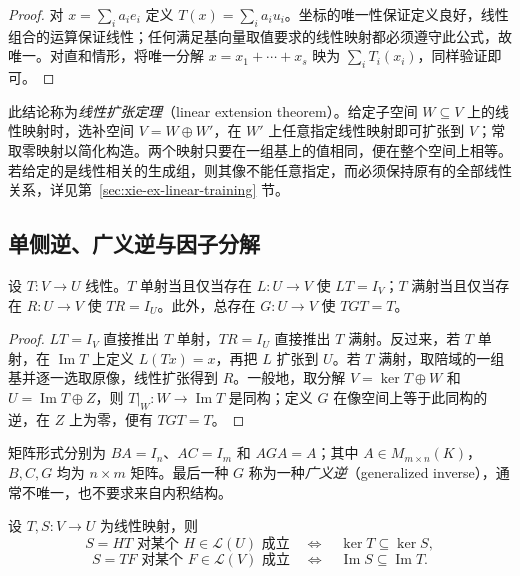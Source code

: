 \begin{proof}
对 $x=\sum_i a_ie_i$ 定义 $T(x)=\sum_i a_iu_i$。坐标的唯一性保证定义良好，线性组合的运算保证线性；任何满足基向量取值要求的线性映射都必须遵守此公式，故唯一。对直和情形，将唯一分解 $x=x_1+\cdots+x_s$ 映为 $\sum_iT_i(x_i)$，同样验证即可。
\end{proof}

此结论称为\emph{线性扩张定理}（linear extension theorem）。给定子空间 $W\subseteq V$ 上的线性映射时，选补空间 $V=W\oplus W'$，在 $W'$ 上任意指定线性映射即可扩张到 $V$；常取零映射以简化构造。两个映射只要在一组基上的值相同，便在整个空间上相等。若给定的是线性相关的生成组，则其像不能任意指定，而必须保持原有的全部线性关系，详见第~\ref{sec:xie-ex-linear-training} 节。

\subsection{单侧逆、广义逆与因子分解}

\begin{proposition}
\label{prop:xie-ex-splitting-inverses}
设 $T:V\to U$ 线性。$T$ 单射当且仅当存在 $L:U\to V$ 使 $LT=I_V$；$T$ 满射当且仅当存在 $R:U\to V$ 使 $TR=I_U$。此外，总存在 $G:U\to V$ 使 $TGT=T$。
\end{proposition}

\begin{proof}
$LT=I_V$ 直接推出 $T$ 单射，$TR=I_U$ 直接推出 $T$ 满射。反过来，若 $T$ 单射，在 $\operatorname{Im}T$ 上定义 $L(Tx)=x$，再把 $L$ 扩张到 $U$。若 $T$ 满射，取陪域的一组基并逐一选取原像，线性扩张得到 $R$。一般地，取分解 $V=\ker T\oplus W$ 和 $U=\operatorname{Im}T\oplus Z$，则 $T|_W:W\to\operatorname{Im}T$ 是同构；定义 $G$ 在像空间上等于此同构的逆，在 $Z$ 上为零，便有 $TGT=T$。
\end{proof}

矩阵形式分别为 $BA=I_n$、$AC=I_m$ 和 $AGA=A$；其中 $A\in M_{m\times n}(K)$，$B,C,G$ 均为 $n\times m$ 矩阵。最后一种 $G$ 称为一种\emph{广义逆}（generalized inverse），通常不唯一，也不要求来自内积结构。

\begin{proposition}
\label{prop:xie-ex-factorization}
设 $T,S:V\to U$ 为线性映射，则
\[
    S=HT\text{ 对某个 }H\in\mathcal L(U)\text{ 成立}
    \quad\Longleftrightarrow\quad \ker T\subseteq\ker S,
\]
\[
    S=TF\text{ 对某个 }F\in\mathcal L(V)\text{ 成立}
    \quad\Longleftrightarrow\quad \operatorname{Im}S\subseteq\operatorname{Im}T.
\]
\end{proposition}

